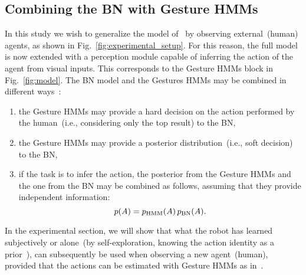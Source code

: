 \subsection{Combining the \acs{BN} with Gesture \acsp{HMM}}
\label{sec:combination}

In this study we wish to generalize the model of~\cite{salvi:2012:smcb} by observing external~(human) agents, as shown in Fig.~\ref{fig:experimental_setup}. For this reason, the full model is now extended with a perception module capable of inferring the action of the agent from visual inputs. This corresponds to the Gesture \acp{HMM} block in Fig.~\ref{fig:model}. The \AffWords{} \acf{BN} model and the Gestures \acp{HMM} may be combined in different ways~\cite{pan:2006:ictai}:
\begin{enumerate}
\item the Gesture \acp{HMM} may provide a hard decision on the action performed by the human~(i.e., considering only the top result) to the \ac{BN},

\item the Gesture \acp{HMM} may provide a posterior distribution~(i.e., soft decision) to the \ac{BN},

\item if the task is to infer the action, the posterior from the Gesture \acp{HMM} and the one from the \ac{BN} may be combined as follows, assuming that they provide independent information:
\begin{equation*}
p(A) = p_{\text{HMM}}(A) \, p_{\text{BN}}(A).
\end{equation*}
\end{enumerate}

In the experimental section, we will show that what the robot has learned subjectively or alone~(by self-exploration, knowing the action identity as a prior~\cite{salvi:2012:smcb}), can subsequently be used when observing a new agent~(human), provided that the actions can be estimated with Gesture \acp{HMM} as in~\cite{saponaro:2013:crhri}.
